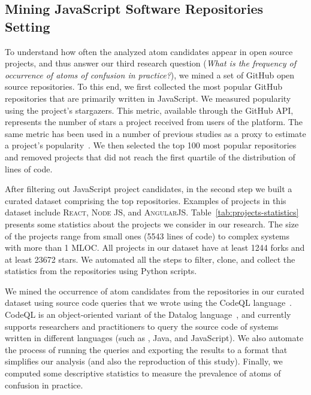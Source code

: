 \subsection{Mining JavaScript Software Repositories Setting}

To understand how often the analyzed atom candidates appear in open source projects, and thus answer our third research question (\emph{What is the frequency of occurrence of atoms of confusion in practice?}), we mined a set of GitHub open source repositories. To this end, we first collected the most popular GitHub repositories that are primarily written in JavaScript. We measured popularity using the project's stargazers. This metric, available through the GitHub API, represents the number of stars a project received from users of the platform. The same metric has been used in a number of previous studies as a proxy to estimate a project's popularity~\cite{gyimesi2019bugsjs,canedo:esem2020}. We then selected the top 100 most popular repositories and removed projects that did not reach the first quartile of the distribution of lines of code.

After filtering out JavaScript project candidates, in the second step we built a curated dataset comprising the top \minedprojects repositories. Examples of projects in this dataset include \textsc{React}, \textsc{Node JS}, and \textsc{AngularJS}. Table~\ref{tab:projects-statistics} presents some statistics about the projects we consider in our research. The size of the projects range from small ones (5543 lines of code) to complex systems with more than 1 MLOC. All projects in our dataset have at least \num{1244} forks and at least \num{23672} stars. We automated all the steps to filter, clone, and collect the statistics from the repositories using Python scripts.

We mined the occurrence of atom candidates from the repositories in our curated dataset using source code queries that we wrote using the CodeQL language~\cite{moor:gttse2007}. CodeQL is an object-oriented variant of the Datalog language~\cite{rodriguez2020efficient}, and currently supports researchers and practitioners to query the source code of systems written in different languages (such as \cpplang, Java, and JavaScript). We also automate the process of running the queries and exporting the results to a format that simplifies our analysis (and also the reproduction of this study). Finally, we computed some descriptive statistics to measure the prevalence of atoms of confusion in practice. 

